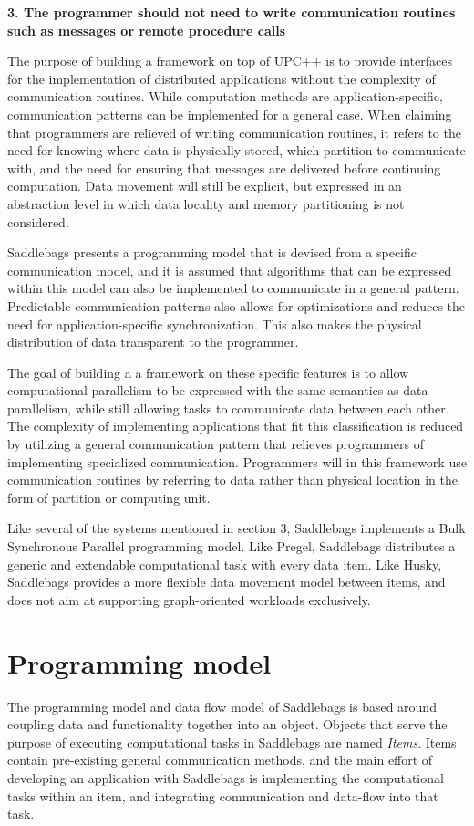 \documentclass{uit-report}
\begin{document}
\hspace{4ex} \textbf{3. The programmer should not need to write communication routines such as messages or remote procedure calls}

The purpose of building a framework on top of UPC++ is to provide interfaces for the implementation of distributed applications without the complexity of communication routines. While computation methods are application-specific, communication patterns can be implemented for a general case. When claiming that programmers are relieved of writing communication routines, it refers to the need for knowing where data is physically stored, which partition to communicate with, and the need for ensuring that messages are delivered before continuing computation. Data movement will still be explicit, but expressed in an abstraction level in which data locality and memory partitioning is not considered.

Saddlebags presents a programming model that is devised from a specific communication model, and it is assumed that algorithms that can be expressed within this model can also be implemented to communicate in a general pattern. Predictable communication patterns also allows for optimizations and reduces the need for application-specific synchronization. This also makes the physical distribution of data transparent to the programmer.

The goal of building a a framework on these specific features is to allow computational parallelism to be expressed with the same semantics as data parallelism, while still allowing tasks to communicate data between each other. The complexity of implementing applications that fit this classification is reduced by utilizing a general communication pattern that relieves programmers of implementing specialized communication. Programmers will in this framework use communication routines by referring to data rather than physical location in the form of partition or computing unit.

Like several of the systems mentioned in section 3, Saddlebags implements a Bulk Synchronous Parallel programming model. Like Pregel, Saddlebags distributes a generic and extendable computational task with every data item. Like Husky, Saddlebags provides a more flexible data movement model between items, and does not aim at supporting graph-oriented workloads exclusively.

\section{Programming model}
The programming model and data flow model of Saddlebags is based around coupling data and functionality together into an object. Objects that serve the purpose of executing computational tasks in Saddlebags are named \emph{Items}. Items contain pre-existing general communication methods, and the main effort of developing an application with Saddlebags is implementing the computational tasks within an item, and integrating communication and data-flow into that task.
\end{document}
